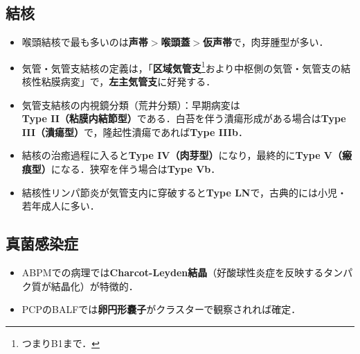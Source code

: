 \subsection{結核}
\begin{itemize}

\item 喉頭結核で最も多いのは\textbf{声帯$>$喉頭蓋$>$仮声帯}で，肉芽腫型が多い．
\item 気管・気管支結核の定義は，「\textbf{区域気管支}\footnote{つまりB1まで．}おより中枢側の気管・気管支の結核性粘膜病変」で，\textbf{左主気管支}に好発する．
\item 気管支結核の内視鏡分類（荒井分類）：早期病変は\textbf{Type II（粘膜内結節型）}である．白苔を伴う潰瘍形成がある場合は\textbf{Type III（潰瘍型）}で，隆起性潰瘍であれば\textbf{Type IIIb}．
\item 結核の治癒過程に入ると\textbf{Type IV（肉芽型）}になり，最終的に\textbf{Type V（瘢痕型）}になる．狭窄を伴う場合は\textbf{Type Vb}．

\item 結核性リンパ節炎が気管支内に穿破すると\textbf{Type LN}で，古典的には小児・若年成人に多い．

\end{itemize}


\subsection{真菌感染症}

\begin{itemize}

\item ABPMでの病理では\textbf{Charcot-Leyden結晶}（好酸球性炎症を反映するタンパク質が結晶化）が特徴的．
\item PCPのBALFでは\textbf{卵円形嚢子}がクラスターで観察されれば確定．
\end{itemize}

